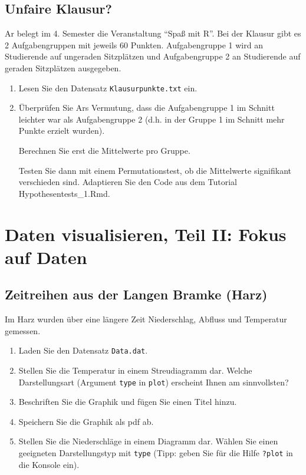 \documentclass[]{book}
\providecommand{\tightlist}{%
  \setlength{\itemsep}{0pt}\setlength{\parskip}{0pt}}
\begin{document}
\hypertarget{klausur}{%
\subsection{Unfaire Klausur?}\label{klausur}}

Ar belegt im 4. Semester die Veranstaltung ``Spaß mit R''. Bei der Klausur gibt es 2 Aufgabengruppen mit jeweils 60 Punkten. Aufgabengruppe 1 wird an Studierende auf ungeraden Sitzplätzen und Aufgabengruppe 2 an Studierende auf geraden Sitzplätzen ausgegeben.

\begin{enumerate}
\def\labelenumi{\arabic{enumi}.}
\tightlist
\item
  Lesen Sie den Datensatz \texttt{Klausurpunkte.txt} ein.
\item
  Überprüfen Sie Ars Vermutung, dass die Aufgabengruppe 1 im Schnitt leichter war als Aufgabengruppe 2 (d.h. in der Gruppe 1 im Schnitt mehr Punkte erzielt wurden).

  Berechnen Sie erst die Mittelwerte pro Gruppe.

  Testen Sie dann mit einem Permutationstest, ob die Mittelwerte signifikant verschieden sind. Adaptieren Sie den Code aus dem Tutorial Hypothesentests\_1.Rmd.
\end{enumerate}

\hypertarget{daten-visualisieren-teil-ii-fokus-auf-daten}{%
\section{Daten visualisieren, Teil II: Fokus auf Daten}\label{daten-visualisieren-teil-ii-fokus-auf-daten}}

\hypertarget{zeitreihen-aus-der-langen-bramke-harz}{%
\subsection{Zeitreihen aus der Langen Bramke (Harz)}\label{zeitreihen-aus-der-langen-bramke-harz}}

Im Harz wurden über eine längere Zeit Niederschlag, Abfluss und Temperatur gemessen.

\begin{enumerate}
\def\labelenumi{\arabic{enumi}.}
\tightlist
\item
  Laden Sie den Datensatz \texttt{Data.dat}.
\item
  Stellen Sie die Temperatur in einem Streudiagramm dar. Welche Darstellungsart (Argument \texttt{type} in \texttt{plot}) erscheint Ihnen am sinnvollsten?
\item
  Beschriften Sie die Graphik und fügen Sie einen Titel hinzu.
\item
  Speichern Sie die Graphik als pdf ab.
\item
  Stellen Sie die Niederschläge in einem Diagramm dar. Wählen Sie einen geeigneten Darstellungstyp mit \texttt{type} (Tipp: geben Sie für die Hilfe \texttt{?plot} in die Konsole ein).
\end{enumerate}
\end{document}
